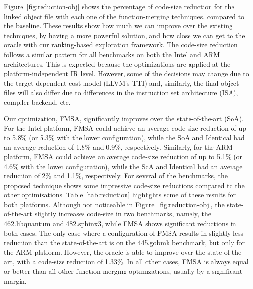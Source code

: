 

Figure~\ref{fig:reduction-obj} shows the
percentage of code-size reduction for the linked object file with each one of
the function-merging techniques, compared to the baseline.
These results show how much we can improve over the existing techniques, by
having a more powerful solution, and how close we can get to the oracle with our
ranking-based exploration framework.
The code-size reduction follows a similar pattern for all benchmarks on both
the Intel and ARM architectures.
This is expected because the optimizations are applied at the
platform-independent IR level.
However, some of the decisions may change due to the target-dependent cost model
(LLVM's TTI) and, similarly, the final object files will also differ due to
differences in the instruction set architecture (ISA), compiler backend, etc.

Our optimization, FMSA, significantly improves over the state-of-the-art (SoA).
For the Intel platform, FMSA could achieve an average code-size reduction of up
to 5.8\% (or 5.3\% with the lower configuration), while the SoA and Identical
had an average reduction of 1.8\% and 0.9\%, respectively.
Similarly, for the ARM platform, FMSA could achieve an average code-size
reduction of up to 5.1\% (or 4.6\% with the lower configuration), while the SoA
and Identical had an average reduction of 2\% and 1.1\%, respectively.
For several of the benchmarks, the proposed technique shows some impressive
code-size reductions compared to the other optimizations.
Table~\ref{tab:reduction} highlights some of these results for both platforms.
Although not noticeable in Figure~\ref{fig:reduction-obj}, the state-of-the-art
slightly increases code-size in two benchmarks, namely, the 462.libquantum and
482.sphinx3, while FMSA shows significant reductions in both cases.
The only case where a configuration of FMSA results in slightly less reduction
than the state-of-the-art is on the 445.gobmk benchmark, but only for the ARM
platform.
However, the oracle is able to improve over the state-of-the-art,
with a code-size reduction of 1.33\%.
In all other cases, FMSA is always equal or better than all other
function-merging optimizations, usually by a significant margin.

